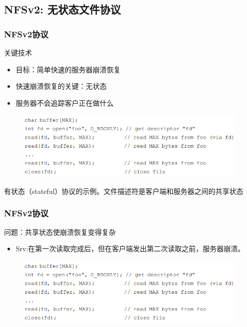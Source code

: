     \subsection{NFSv2: 无状态文件协议}
\begin{frame}[fragile]
    \frametitle{NFSv2协议}
关键技术
    \begin{itemize}
        \item 目标：简单快速的服务器崩溃恢复\pause
        \item 快速崩溃恢复的关键：无状态
        \item 服务器不会追踪客户正在做什么
    \end{itemize}
    \begin{figure}
    \includegraphics[width=0.65\linewidth]{figs/stateful-code.png}
    \end{figure}
有状态（stateful）协议的示例。文件描述符是客户端和服务器之间的共享状态 
\end{frame}

\begin{frame}[fragile]
    \frametitle{NFSv2协议}
    问题：共享状态使崩溃恢复变得复杂
    \begin{itemize}
        \item Srv:在第一次读取完成后，但在客户端发出第二次读取之前，服务器崩溃。
    \end{itemize}
    \begin{figure}
        \includegraphics[width=1.0\linewidth]{figs/stateful-code.png}
    \end{figure}

\end{frame}


